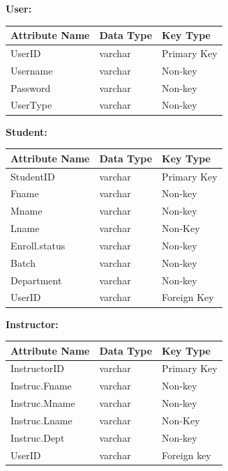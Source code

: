 \documentclass{article}
\begin{document}
\textbf{User:}

\begin{table}[H]
\centering
\begin{large}
\begin{tabular}{|l|l|l|}
\hline
\textbf{Attribute Name} & \textbf{Data Type} & \textbf{Key Type} \\ \hline
UserID & varchar& Primary Key \\\hline
Username & varchar & Non-key\\\hline
Password & varchar& Non-key\\\hline
UserType & varchar& Non-key\\ \hline
\end{tabular}
\end{large}
\end{table}



\textbf{Student:}
\begin{table}[H]
\centering
\begin{large}
\begin{tabular}{|l|l|l|}
\hline
\textbf{Attribute Name} & \textbf{Data Type} & \textbf{Key Type} \\ \hline
StudentID & varchar & Primary Key \\\hline
Fname & varchar & Non-key\\\hline
Mname & varchar & Non-key\\\hline
Lname & varchar & Non-Key \\\hline
Enroll.status & varchar & Non-key\\\hline
Batch & varchar & Non-key\\\hline
Department & varchar & Non-key\\ \hline
UserID & varchar & Foreign Key\\ \hline
\end{tabular}
\end{large}
\end{table}

\textbf{Instructor:}
\begin{table}[H]
\centering
\begin{large}
\begin{tabular}{|l|l|l|}
\hline
\textbf{Attribute Name} & \textbf{Data Type} & \textbf{Key Type} \\ \hline
InstructorID & varchar & Primary Key \\\hline
Instruc.Fname & varchar & Non-key\\\hline
Instruc.Mname & varchar & Non-key\\ \hline
Instruc.Lname & varchar & Non-Key \\ \hline
Instruc.Dept & varchar & Non-key\\  \hline
UserID & varchar & Foreign key\\ \hline
\end{tabular}
\end{large}
\end{table}
\end{document}
